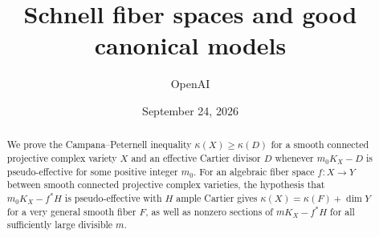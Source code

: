 \documentclass[11pt,letterpaper]{article}
\title{Schnell fiber spaces and good canonical models}
\author{OpenAI}
\date{September 24, 2026}
\theoremstyle{definition}
\numberwithin{equation}{section}
\begin{document}
\maketitle
\begin{abstract}
We prove the Campana--Peternell inequality \(\kappa(X)\geq\kappa(D)\) for a
smooth connected projective complex variety \(X\) and an effective Cartier
divisor \(D\) whenever \(m_0K_X-D\) is pseudo-effective for some positive
integer \(m_0\). For an algebraic fiber space \(f\colon X\to Y\) between
smooth connected projective complex varieties, the hypothesis that
\(m_0K_X-f^*H\) is pseudo-effective with \(H\) ample Cartier gives
\(\kappa(X)=\kappa(F)+\dim Y\) for a very general smooth fiber \(F\), as well
as nonzero sections of \(mK_X-f^*H\) for all sufficiently large divisible
\(m\).
\end{abstract}






\end{document}
